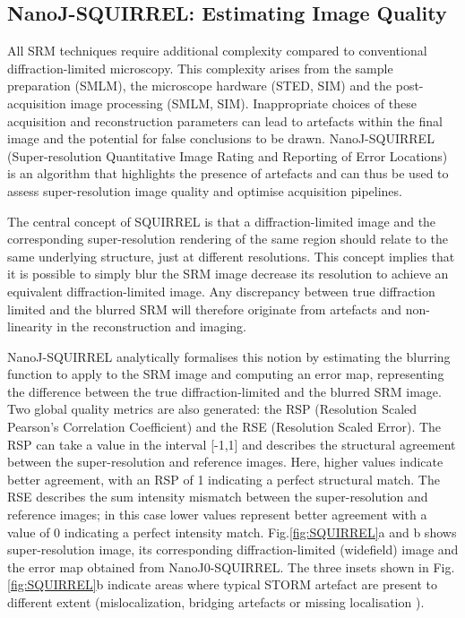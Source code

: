 \subsection*{NanoJ-SQUIRREL: Estimating Image Quality}
All SRM techniques require additional complexity compared to conventional diffraction-limited microscopy. This complexity arises from the sample preparation (SMLM), the microscope hardware (STED, SIM) and the post-acquisition image processing (SMLM, SIM). Inappropriate choices of these acquisition and reconstruction parameters can lead to artefacts within the final image and the potential for false conclusions to be drawn. NanoJ-SQUIRREL (Super-resolution Quantitative Image Rating and Reporting of Error Locations) is an algorithm that highlights the presence of artefacts and can thus be used to assess super-resolution image quality and optimise acquisition pipelines.

The central concept of SQUIRREL is that a diffraction-limited image and the corresponding super-resolution rendering of the same region should relate to the same underlying structure, just at different resolutions. This concept implies that it is possible to simply blur the SRM image decrease its resolution to achieve an equivalent diffraction-limited image. Any discrepancy between true diffraction limited and the blurred SRM will therefore originate from artefacts and non-linearity in the reconstruction and imaging.

NanoJ-SQUIRREL analytically formalises this notion by estimating the blurring function to apply to the SRM image and computing an error map, representing the difference between the true diffraction-limited and the blurred SRM image. Two global quality metrics are also generated: the RSP (Resolution Scaled Pearson’s Correlation Coefficient) and the RSE (Resolution Scaled Error). The RSP can take a value in the interval [-1,1] and describes the structural agreement between the super-resolution and reference images. Here, higher values indicate better agreement, with an RSP of 1 indicating a perfect structural match. The RSE describes the sum intensity mismatch between the super-resolution and reference images; in this case lower values represent better agreement with a value of 0 indicating a perfect intensity match. Fig.\ref{fig:SQUIRREL}a and b shows super-resolution image, its corresponding diffraction-limited (widefield) image and the error map obtained from NanoJ0-SQUIRREL. The three insets shown in Fig.\ref{fig:SQUIRREL}b indicate areas where typical STORM artefact are present to different extent (mislocalization, bridging artefacts or missing localisation \cite{waldchen2015light}). 


